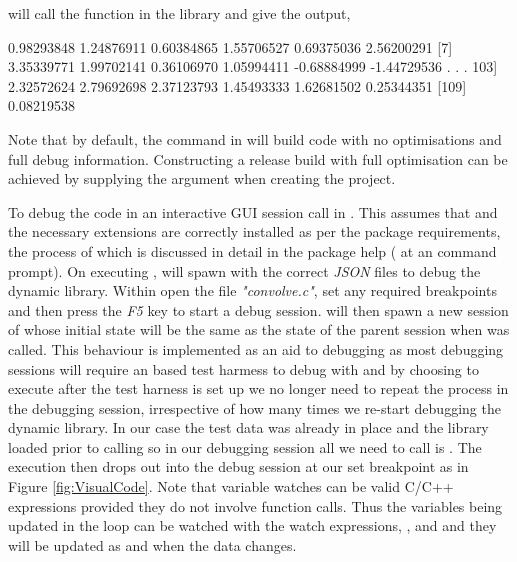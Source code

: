 will call the  function in the library and give the output,

\begin{Schunk}
  \begin{Sinput}
  [1]  0.98293848  1.24876911  0.60384865  1.55706527  0.69375036  2.56200291
  [7]  3.35339771  1.99702141  0.36106970  1.05994411 -0.68884999 -1.44729536
   .
   .
   .
 103]  2.32572624  2.79692698  2.37123793  1.45493333  1.62681502  0.25344351
[109]  0.08219538
  \end{Sinput}
\end{Schunk}

Note that by default, the  command in  will build code with no optimisations and full debug information. 
Constructing a release build with full optimisation can be achieved by supplying the  argument when creating the project. 

To debug the code in an interactive GUI session call  in . This assumes that
 and the necessary extensions are correctly installed as per the package requirements, the process of which is discussed in 
detail in the package help ( at an  command prompt). On executing ,  will spawn  
with the correct \emph{JSON} files to debug the dynamic library. Within  open the file \emph{"convolve.c"}, set any required
breakpoints and then press the \emph{F5} key to start a debug session.  will then spawn a new session of  whose initial state
will be the same as the state of the parent  session when  was called. This behaviour is implemented as an aid to debugging as most 
debugging sessions will require an  based test harmess to debug with and by choosing to execute  after the  test harness is 
set up we no longer need to repeat the process in the debugging session, irrespective of how many times we re-start debugging the dynamic library. In our case 
the test data was already in place and the library loaded prior to calling  so in our debugging session all we need to call is . 
The execution then drops out into the debug session at our set breakpoint as in Figure \ref{fig:VisualCode}. Note that variable watches can be valid C/C++
expressions provided they do not involve function calls. Thus the variables being updated in the loop can be watched with the watch expressions, , 
 and  and they will be updated as and when the data changes. 

